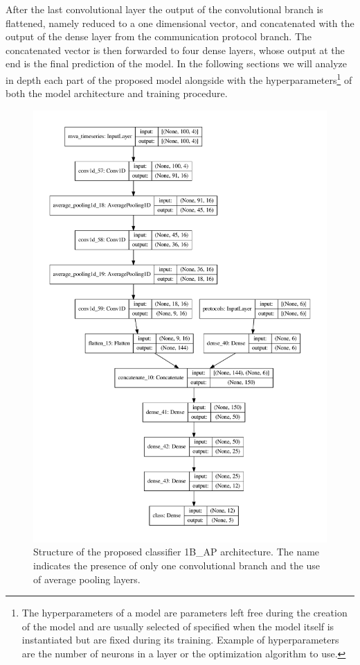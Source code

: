 After the last convolutional layer the output of the convolutional branch is flattened, namely reduced to a one dimensional vector, and concatenated with the output of the dense layer from the communication protocol branch. The concatenated vector is then forwarded to four dense layers,  whose output at the end is the final prediction of the model. In the following sections we will analyze in depth each part of the proposed model alongside with the hyperparameters\footnote{The hyperparameters of a model are parameters left free during the creation of the model and are usually selected of specified when the model itself is instantiated but are fixed during its training. Example of hyperparameters are the number of neurons in a layer or the optimization algorithm to use.} of both the model architecture and training procedure.


\begin{figure}
    \centering
\includegraphics[height=0.95\textheight]{images/models/model_1bap.pdf}
\caption{{Structure of the proposed classifier 1B\_AP architecture. The name indicates the presence of only one convolutional branch and the use of average pooling layers.}}
    \label{fig:1b_model}
\end{figure}



